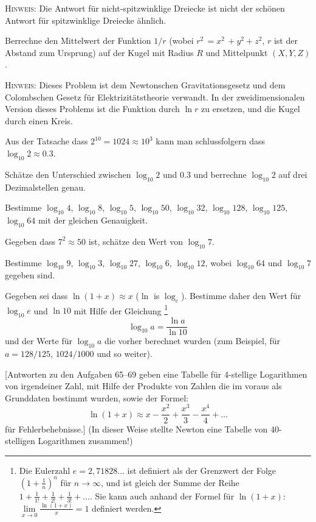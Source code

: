 \documentclass[12pt]{article} %
\begin{document}
\textsc{Hinweis:} Die Antwort für nicht-spitzwinklige Dreiecke ist nicht der schönen Antwort für spitzwinklige Dreiecke ähnlich. 

\bigskip
{} 
Berrechne den Mittelwert der Funktion $1/r$ (wobei $r^2\,=x^2\,+y^2+z^2$, $r$ ist der Abstand zum Ursprung)  auf der Kugel mit Radius $R$ und Mittelpunkt $(X,Y,Z)$.

\medskip
\textsc{Hinweis:} Dieses Problem ist dem Newtonschen Gravitationsgesetz und dem Colombschen Gesetz für Elektrizitätstheorie verwandt. In der zweidimensionalen Version dieses Problems ist die Funktion durch $\ln r$ zu ersetzen, und die Kugel durch einen Kreis.


\bigskip
{} Aus der Tatsache dass $2^{10}=1024 \approx 10^3$ kann man schlussfolgern dass $\log_{10} 2 \approx 0{.}3$.

Schätze den Unterschied zwischen $\log_{10} 2$ und $0{.}3$ und berrechne $\log_{10} 2$ auf drei Dezimalstellen genau. 

\bigskip
{} Bestimme $\log_{10} 4$, $\log_{10} 8$,
$\log_{10} 5$, $\log_{10} 50$, $\log_{10} 32$, $\log_{10} 128$,
$\log_{10} 125$, $\log_{10} 64$ mit der gleichen Genauigkeit.

\bigskip
{} Gegeben dass $7^2 \approx 50$ ist, schätze den Wert von $\log_{10} 7$. 

\bigskip
{} Bestimme $\log_{10} 9$, $\log_{10} 3$,
$\log_{10} 27$, $\log_{10} 6$, $\log_{10} 12$, wobei $\log_{10} 64$ und $\log_{10} 7$ gegeben sind.

\bigskip
{} Gegeben sei dass $\ln (1+x) \approx x$ ($\ln$ is $\log_e$). Bestimme daher den Wert für $\log_{10} e$ und $\ln 10$ mit Hilfe der Gleichung \footnote{
Die Eulerzahl $e = 2{,}71828\dots$ ist definiert als der Grenzwert der Folge $\left(1+\frac1n\right)^n$ für $n\to \infty$, und ist gleich der Summe der Reihe 
$1+\frac 1{1!} +\frac 1{2!}+\frac 1{3!}+\dots$. Sie kann auch anhand der Formel für $\ln (1+x)$: $\lim\limits_{x\to 0}\frac{\ln(1+x)}{x} = 1$ definiert werden.}\vspace{-\jot}
%
$$
\log_{10} a=\frac{\ln a}{\ln 10}
$$ 
und der Werte für $\log_{10} a$ die vorher berechnet wurden (zum Beispiel, für $a=128/125$, $1024/1000$ und so weiter).

[Antworten zu den Aufgaben 65--69 geben eine Tabelle für 4-stellige Logarithmen von irgendeiner Zahl, mit Hilfe der Produkte von Zahlen die im voraus als Grunddaten bestimmt wurden, sowie der Formel: 
\vspace{-2\jot}
\[
\ln (1+x) \approx x-\frac{x^2}{2}+\frac{x^3}{3}-\frac{x^4}{4}+\dots
\]
für Fehlerbehebnisse.] (In dieser Weise stellte Newton eine Tabelle von 40-stelligen Logarithmen zusammen!)
\end{document}
